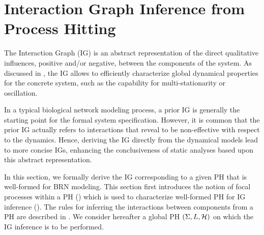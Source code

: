 \section{Interaction Graph Inference from Process Hitting}\label{sec:infer-IG}


The Interaction Graph (IG) is an abstract representation of the direct qualitative influences,
positive and/or negative, between the components of the system.
As discussed in , the IG allows to efficiently characterize global dynamical
properties for the concrete system, such as the capability for multi-stationarity or oscillation.


In a typical biological network modeling process, a prior IG is generally the starting point for
the formal system specification.
However, it is common that the prior IG actually refers to interactions that reveal to be 
non-effective with respect to the dynamics.
Hence, deriving the IG directly from the dynamical models lead to more concise IGs, enhancing the
conclusiveness of static analyses based upon this abstract representation.

In this section, we formally derive the IG corresponding to a given PH that is well-formed for BRN
modeling.
This section first introduces the notion of focal processes within a PH ()
which is used to characterize well-formed PH for IG inference ().
The rules for inferring the interactions between components from a PH are
described in .
We consider hereafter a global PH $(\Sigma,L,\mathcal{H})$ on which the IG inference is to be
performed.


